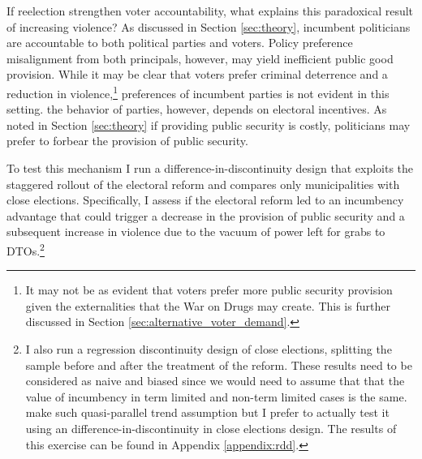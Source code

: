 \documentclass[12pt]{amsart}
\makeatletter
\def\subsection{\@startsection{subsection}{2}
	\z@{.8\linespacing\@plus.7\linespacing}{.7\linespacing}{\large}}
\numberwithin{equation}{section}
\theoremstyle{definition}
\theoremstyle{definition}
\theoremstyle{definition}
\makeatother
\begin{document}
 
If reelection strengthen voter accountability, what explains this paradoxical result of increasing violence? As discussed in Section \ref{sec:theory}, incumbent politicians are accountable to both political parties and voters. Policy preference misalignment from both principals, however, may yield inefficient public good provision. While it may be clear that voters prefer criminal deterrence and a reduction in violence,\footnote{It may not be as evident that voters prefer more public security provision given the externalities that the War on Drugs may create. This is further discussed in Section \ref{sec:alternative_voter_demand}.} preferences of incumbent parties is not evident in this setting. the behavior of parties, however, depends on electoral incentives. As noted in Section \ref{sec:theory} if providing public security is costly, politicians may prefer to forbear the provision of public security. 

To test this mechanism I run %
a difference-in-discontinuity design that exploits the staggered rollout of the electoral reform and compares only municipalities with close elections.%
 Specifically, I assess if the electoral reform led to an incumbency advantage that could trigger a decrease in the provision of public security and a subsequent increase in violence due to the vacuum of power left for grabs to DTOs.\footnote{I also run a regression discontinuity design of close elections, splitting the sample before and after the treatment of the reform. These results need to be considered as naive and biased since we would need to assume that that the value of incumbency in term limited and non-term limited cases is the same. \citet{fowler_hall_2014} make such quasi-parallel trend assumption but I prefer to actually test it using an difference-in-discontinuity in close elections design. The results of this exercise can be found in Appendix \ref{appendix:rdd}.}   
  
\end{document}
